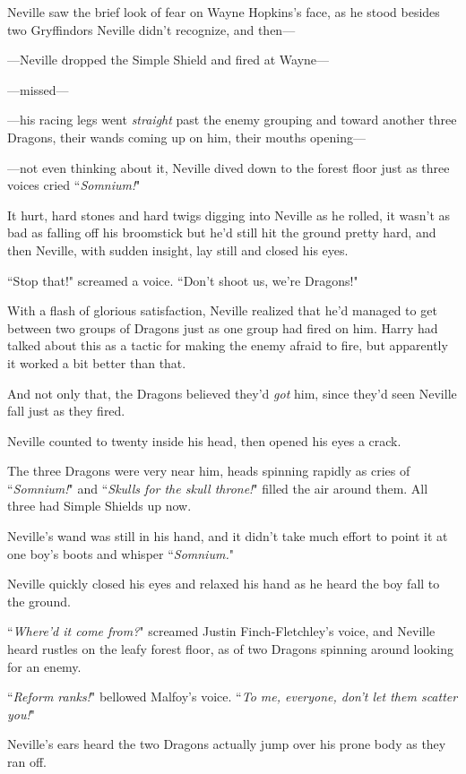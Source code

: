 Neville saw the brief look of fear on Wayne Hopkins's face, as he stood besides two Gryffindors Neville didn't recognize, and then—

—Neville dropped the Simple Shield and fired at Wayne—

—missed—

—his racing legs went \emph{straight} past the enemy grouping and toward another three Dragons, their wands coming up on him, their mouths opening—

—not even thinking about it, Neville dived down to the forest floor just as three voices cried ``\emph{Somnium!}"

It hurt, hard stones and hard twigs digging into Neville as he rolled, it wasn't as bad as falling off his broomstick but he'd still hit the ground pretty hard, and then Neville, with sudden insight, lay still and closed his eyes.

``Stop that!" screamed a voice. ``Don't shoot us, we're Dragons!"

With a flash of glorious satisfaction, Neville realized that he'd managed to get between two groups of Dragons just as one group had fired on him. Harry had talked about this as a tactic for making the enemy afraid to fire, but apparently it worked a bit better than that.

And not only that, the Dragons believed they'd \emph{got} him, since they'd seen Neville fall just as they fired.

Neville counted to twenty inside his head, then opened his eyes a crack.

The three Dragons were very near him, heads spinning rapidly as cries of ``\emph{Somnium!}" and ``\emph{Skulls for the skull throne!}" filled the air around them. All three had Simple Shields up now.

Neville's wand was still in his hand, and it didn't take much effort to point it at one boy's boots and whisper ``\emph{Somnium.}"

Neville quickly closed his eyes and relaxed his hand as he heard the boy fall to the ground.

``\emph{Where'd it come from?}" screamed Justin Finch-Fletchley's voice, and Neville heard rustles on the leafy forest floor, as of two Dragons spinning around looking for an enemy.

``\emph{Reform ranks!}" bellowed Malfoy's voice. ``\emph{To me, everyone, don't let them scatter you!}"

Neville's ears heard the two Dragons actually jump over his prone body as they ran off.

